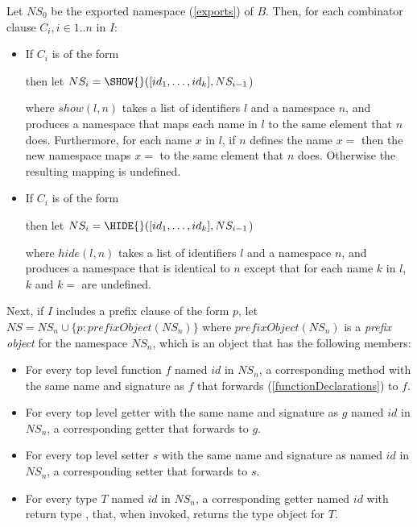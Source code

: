 \documentclass{article}
\begin{document}
\LMHash{}
Let $NS_0$ be the exported namespace (\ref{exports}) of $B$.
Then, for each combinator clause $C_i, i \in 1 .. n$ in $I$:
\begin{itemize}
\item If $C_i$ is of the form


then let $NS_i = \SHOW{}([id_1, \ldots, id_k], NS_{i-1}$)

where $show(l,n)$ takes a list of identifiers $l$ and a namespace $n$, and produces a namespace that maps each name in $l$ to the same element that $n$ does.
Furthermore, for each name $x$ in $l$, if $n$ defines the name $x=$ then the new namespace maps $x=$ to the same element that $n$ does.
Otherwise the resulting mapping is undefined.

\item If $C_i$ is of the form


then let $NS_i = \HIDE{}([id_1, \ldots, id_k], NS_{i-1}$)

where $hide(l, n)$ takes a list of identifiers $l$ and a namespace $n$, and produces a namespace that is identical to $n$ except that for each name $k$ in $l$, $k$ and $k=$ are undefined.
\end{itemize}

\LMHash{}
Next, if $I$ includes a prefix clause of the form \AS{} $p$, let $NS = NS_n \cup \{p: prefixObject(NS_n)\}$ where $prefixObject(NS_n)$ is a {\em prefix object} for the namespace $NS_n$, which is an object that has the following members:

\begin{itemize}
\item For every top level function $f$ named $id$ in $NS_n$, a corresponding method with the same name and signature as $f$ that forwards (\ref{functionDeclarations}) to $f$.
\item For every top level getter with the same name and signature as $g$ named $id$ in $NS_n$, a corresponding getter that forwards to $g$.
\item For every top level setter $s$ with the same name and signature as named $id$ in $NS_n$, a corresponding setter that forwards to $s$.
\item For every type $T$ named $id$ in $NS_n$, a corresponding getter named $id$ with return type , that, when invoked, returns the type object for $T$.
\end{itemize}
\end{document}
